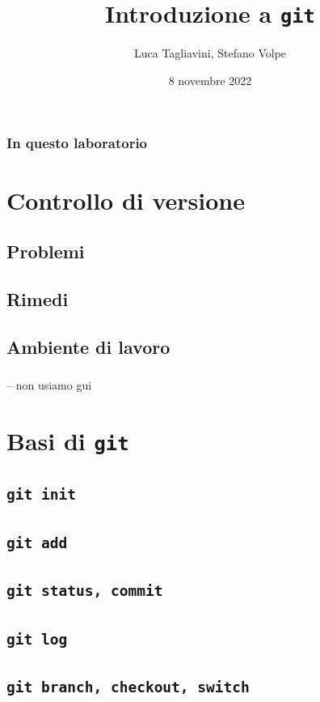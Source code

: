\documentclass{beamer}
\title{Introduzione a \texttt{git}}
\author{Luca Tagliavini, Stefano Volpe}
\institute{Università di Bologna, corso di Laurea in Informatica}
\date{8 novembre 2022}
\begin{document}
\frame{\titlepage}

\begin{frame}
  \frametitle{In questo laboratorio}
  \tableofcontents
\end{frame}

\section{Controllo di versione}

\subsection{Problemi}
\begin{frame}
  \frametitle{}
\end{frame}

\subsection{Rimedi}
\begin{frame}
  \frametitle{}
\end{frame}

\subsection{Ambiente di lavoro}
\begin{frame}
  \frametitle{}
\end{frame}

-- non usiamo gui

\section{Basi di \texttt{git}}

\subsection{\texttt{git init}}
\begin{frame}
  \frametitle{}
\end{frame}

\subsection{\texttt{git add}}
\begin{frame}
  \frametitle{}
\end{frame}

\subsection{\texttt{git status, commit}}
\begin{frame}
  \frametitle{}
\end{frame}

\subsection{\texttt{git log}}
\begin{frame}
  \frametitle{}
\end{frame}

\subsection{\texttt{git branch, checkout, switch}}
\begin{frame}
  \frametitle{}
\end{frame}
\end{document}
